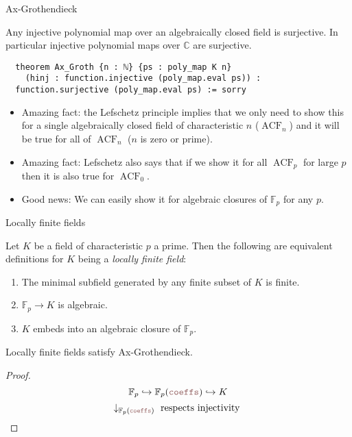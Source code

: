 \documentclass[10pt]{beamer}
\newcommand{\code}[1]{\texttt{\color{mono}#1}}
\newcommand{\C}{\mathbb{C}}
\newcommand{\F}{\mathbb{F}}
\newcommand{\hookr}{\hookrightarrow}
\newcommand{\<}{\langle}
\renewcommand{\>}{\rangle}
\DeclareMathOperator{\ACF}{ACF}
\newcommand{\link}[1]{\hypertarget{#1}{}}
\begin{document}
\begin{frame}[fragile]{Ax-Grothendieck}

  \begin{theorem}[Ax-Grothendieck]
    \link{ax_groth}
    Any injective polynomial map over an algebraically closed field is surjective.
    In particular injective polynomial maps over $\C$ are surjective.

  \end{theorem}

  \pause

\begin{lstlisting}
  theorem Ax_Groth {n : ℕ} {ps : poly_map K n}
    (hinj : function.injective (poly_map.eval ps)) :
  function.surjective (poly_map.eval ps) := sorry \end{lstlisting}

  \pause

\begin{itemize}[<+->]
  \item Amazing fact: the Lefschetz principle implies that we only need to show
        this for a single algebraically closed field of characteristic $n$ ($\ACF_{n}$)
        and it will be true for all of $\ACF_{n}$ ($n$ is zero or prime).
  \item Amazing fact: Lefschetz also says that if we show it for all
        $\ACF_{p}$ for large $p$ then it is also true for $\ACF_{0}$.
  \item Good news: We can easily show it for algebraic closures of $\F_{p}$
        for any $p$.
\end{itemize}
\end{frame}

\begin{frame}[fragile]{Locally finite fields}
  \begin{definition}
    \link{locally_finite}
    Let $K$ be a field of characteristic $p$ a prime.
    Then the following are equivalent definitions for $K$ being a
    \textit{locally finite field}:
    \begin{enumerate}
        \item The minimal subfield generated by any finite subset of $K$ is finite.
        \item $\F_p \to K$ is algebraic.
        \item $K$ embeds into an algebraic closure of $\F_p$.
    \end{enumerate}
\end{definition}

\begin{theorem}
  \link{ax_groth_local}
  Locally finite fields satisfy Ax-Grothendieck.
\end{theorem}
\begin{proof}
  \[ \F_{p} \hookr \F_{p}(\code{coeffs}) \hookr K\]
  \[ \downarrow_{\F_{p}(\code{coeffs})} \text{ respects injectivity }\]
\end{proof}

\end{frame}
\end{document}
